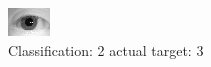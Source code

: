 \begin{figure}[h!]
\begin{center}
\includegraphics[width=0.60\columnwidth]{figures/ID1184_class_2_target_3.png}
\end{center}
\caption{ Classification: 2 actual target: 3}
\label{fig:ID1184_class_2_target_3}
\end{figure}
